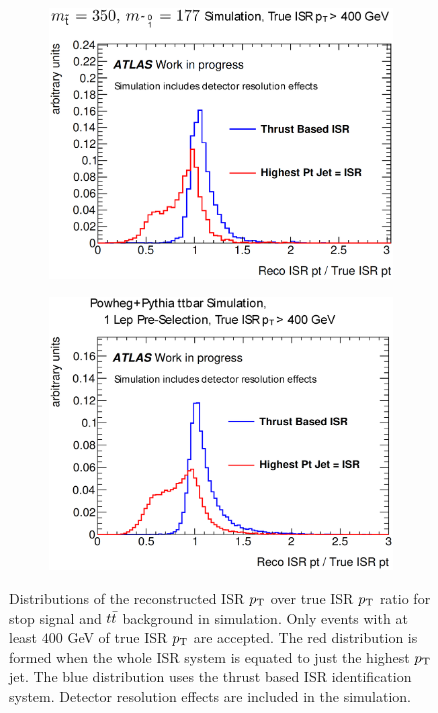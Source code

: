 \begin{figure}[h!]
\centering
    \begin{subfigure}[b]{0.40\textwidth}
    \includegraphics[width=\textwidth]{./figures/strategy/ThrustAlgoEfficiency.eps}
        \caption{ }
    \end{subfigure}
    \begin{subfigure}[b]{0.40\textwidth}
\includegraphics[width=\textwidth]{./figures/strategy/ThrustAlgoEfficiency_ttbar.eps}
        \caption{ }
    \end{subfigure}
\caption[Distributions of the reconstructed ISR $\pt$ over true ISR $\pt$ ratio for stop signal and $\ttbar$ background in simulation]{Distributions of the reconstructed ISR $\pt$ over true ISR $\pt$ ratio for stop signal and $\ttbar$ background in simulation.  Only events with at least $400$ GeV of true ISR $\pt$ are accepted.  The red distribution is formed when the whole ISR system is equated to just the highest $\pt$ jet.  The blue distribution uses the thrust based ISR identification system. Detector resolution effects are included in the simulation. }
 \label{fig:ISRPerformanceIntro}
\end{figure}

